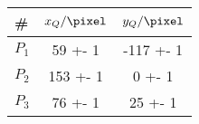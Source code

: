 \begin{tabular}{lSS}
\toprule

{\#} & {$x_Q / \si{\pixel}$} & {$y_Q / \si{\pixel}$} \\

\midrule

$P_1$ & 59 +- 1 & -117 +- 1 \\
$P_2$ & 153 +- 1 & 0 +- 1 \\
$P_3$ & 76 +- 1 & 25 +- 1 \\

\bottomrule
\end{tabular}